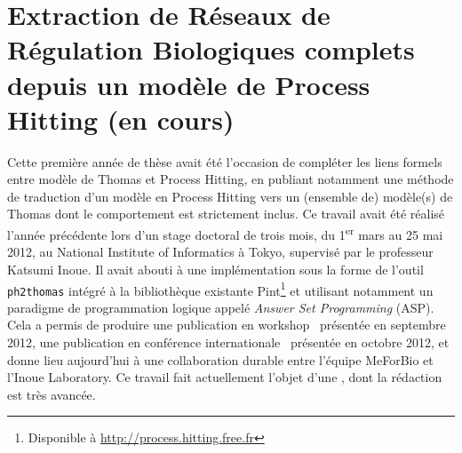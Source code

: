 \section{Extraction de Réseaux de Régulation Biologiques complets depuis un modèle de Process Hitting \normalsize(en cours)}
\label{sec:tcs}

Cette première année de thèse avait été l'occasion de compléter les liens formels entre modèle de Thomas et Process Hitting,
en publiant notamment une méthode de traduction d'un modèle en Process Hitting vers un (ensemble de) modèle(s) de Thomas dont le comportement est strictement inclus.
Ce travail avait été réalisé l'année précédente lors d'un stage doctoral de trois mois, du 1\textsuperscript{er} mars au 25 mai 2012, au National Institute of Informatics à Tokyo, supervisé par le professeur Katsumi Inoue.
Il avait abouti à une implémentation sous la forme de l'outil \texttt{ph2thomas} intégré à la bibliothèque existante Pint\footnote{Disponible à \url{http://process.hitting.free.fr}} et utilisant notamment un paradigme de programmation logique appelé \emph{Answer Set Programming} (ASP).
Cela a permis de produire une publication en workshop~\cite{FPIMR12-LDSSB} présentée en septembre 2012, une publication en conférence internationale~\cite{FPIMR12-CMSB} présentée en octobre 2012, et donne lieu aujourd'hui à une collaboration durable entre l'équipe MeForBio et l'Inoue Laboratory.
Ce travail fait actuellement l'objet d'une , dont la rédaction est très avancée.

